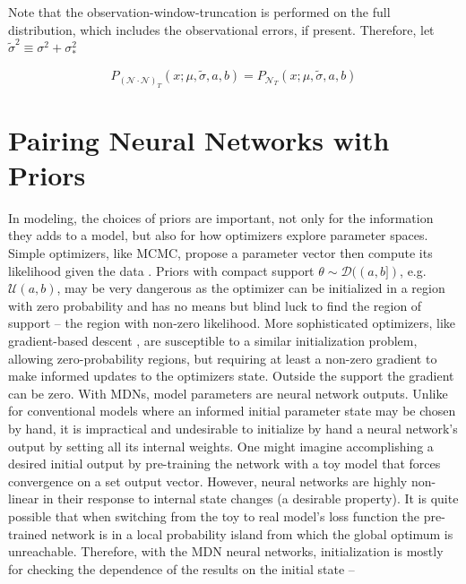 \documentclass[twocolumn]{aastex631}
\newcommand{\mcal}[1]{\mathcal{#1}}
\begin{document}
        Note that the observation-window-truncation is performed on the full
        distribution, which includes the observational errors, if present.
        Therefore, let $\tilde{\sigma}^2 \equiv \sigma^2+\sigma_*^2$

        \begin{equation}
            P_{(\mcal{N}\cdot\mcal{N})_T}(x; \mu, \tilde{\sigma}, a, b) = P_{\mcal{N}_T}(x; \mu, \tilde{\sigma}, a, b)
        \end{equation}


\newpage
\section{Pairing Neural Networks with Priors} \label{app:nns_and_priors}

    In modeling, the choices of priors are important, not only for the
    information they adds to a model, but also for how optimizers explore
    parameter spaces. Simple optimizers, like MCMC, propose a parameter vector
    then compute its likelihood given the data \citep{HoggForeman-Mackey2018}.
    Priors with compact support  $\theta \sim \mcal{D}((a, b])$, e.g.
    $\mcal{U}(a, b)$, may be very dangerous as the optimizer can be initialized
    in a region with zero probability and has no means but blind luck to find
    the region of support -- the region with non-zero likelihood. More
    sophisticated optimizers, like gradient-based descent \citep{cauchy_2009},
    are susceptible to a similar initialization problem, allowing
    zero-probability regions, but requiring at least a non-zero gradient to make
    informed updates to the optimizers state.  Outside the support the gradient
    can be zero.  With MDNs, model parameters are neural network outputs. Unlike
    for conventional models where an informed initial parameter state may be
    chosen by hand, it is impractical and undesirable to initialize by hand a
    neural network's output by setting all its internal weights. One might
    imagine accomplishing a desired initial output by pre-training the network
    with a toy model that forces convergence on a set output vector.  However,
    neural networks are highly non-linear in their response to internal state
    changes (a desirable property). It is quite possible that when switching
    from the toy to real model's loss function the pre-trained network is in a
    local probability island from which the global optimum is unreachable.  
    Therefore, with the MDN neural networks, initialization is mostly
    for checking the dependence of the results on the initial state --
\end{document}
